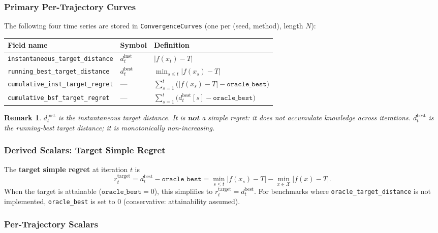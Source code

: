 \documentclass[11pt]{article}
\newtheorem{remark}{Remark}[section]
\newcommand{\dinst}{d_t^{\mathrm{inst}}}
\newcommand{\dbest}{d_t^{\mathrm{best}}}
\newcommand{\rtarget}{r_t^{\mathrm{target}}}
\begin{document}
\subsubsection{Primary Per-Trajectory Curves}
\label{sec:curves}
 
The following four time series are stored in \texttt{ConvergenceCurves} (one per
(seed, method), length $N$):
 
\begin{center}
\begin{tabular}{lll}
\toprule
Field name & Symbol & Definition \\
\midrule
\texttt{instantaneous\_target\_distance}
  & $\dinst$
  & $|f(x_t) - T|$ \\[0.4em]
\texttt{running\_best\_target\_distance}
  & $\dbest$
  & $\min_{s \le t} |f(x_s) - T|$ \\[0.4em]
\texttt{cumulative\_inst\_target\_regret}
  & ---
  & $\sum_{s=1}^{t} \bigl(|f(x_s)-T| - \texttt{oracle\_best}\bigr)$ \\[0.4em]
\texttt{cumulative\_bsf\_target\_regret}
  & ---
  & $\sum_{s=1}^{t} \bigl(\dbest[s] - \texttt{oracle\_best}\bigr)$ \\
\bottomrule
\end{tabular}
\end{center}
 
\begin{remark}
  $\dinst$ is the \emph{instantaneous} target distance.
  It is \textbf{not} a simple regret: it does not accumulate knowledge across iterations.
  $\dbest$ is the running-best target distance;
  it is monotonically non-increasing.
\end{remark}
 
\subsubsection{Derived Scalars: Target Simple Regret}
 
The \textbf{target simple regret} at iteration $t$ is
\[
  \rtarget = \dbest - \texttt{oracle\_best}
           = \min_{s \le t}|f(x_s) - T| - \min_{x \in \mathcal{X}}|f(x) - T|.
\]
When the target is attainable ($\texttt{oracle\_best} = 0$), this simplifies to
$\rtarget = \dbest$.
For benchmarks where \texttt{oracle\_target\_distance} is not implemented,
\texttt{oracle\_best} is set to $0$ (conservative: attainability assumed).
 
\subsubsection{Per-Trajectory Scalars}
\label{sec:scalars}
 
\end{document}
